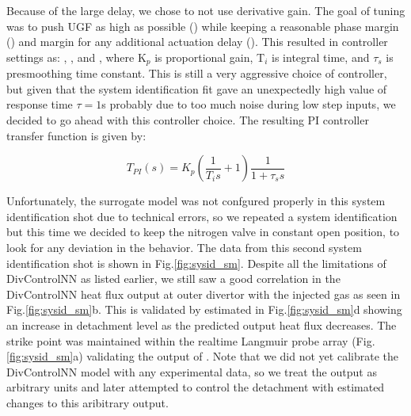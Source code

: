 Because of the large delay, we chose to not use derivative gain.
The goal of tuning was to push \ac{UGF} as high as possible (\AfracUGF) while keeping a reasonable phase margin (\AfracPhaseMargin) and margin for any additional actuation delay (\AfracDelayMargin).
This resulted in controller settings as: \AfracKp, \AfracTi, and \Afracstau, where K$_p$ is proportional gain, T$_i$ is integral time, and $\tau_s$ is presmoothing time constant.
This is still a very aggressive choice of controller, but given that the system identification fit gave an unexpectedly high value of response time $\tau=1$s probably due to too much noise during low step inputs, we decided to go ahead with this controller choice.
The resulting PI controller transfer function is given by:

\begin{equation}
    T_{PI}(s) = K_p \left( \frac{1}{T_i s} + 1\right) \frac{1}{1 + \tau_s s}
\label{eq:PI}
\end{equation}

Unfortunately, the surrogate model was not confgured properly in this system identification shot due to technical errors, so we repeated a system identification but this time we decided to keep the nitrogen valve in constant open position, to look for any deviation in the behavior.
The data from this second system identification shot is shown in Fig.\ref{fig:sysid_sm}.
Despite all the limitations of DivControlNN as listed earlier, we still saw a good correlation in the DivControlNN heat flux output at outer divertor with the injected gas as seen in Fig.\ref{fig:sysid_sm}b.
This is validated by estimated \Afrac in Fig.\ref{fig:sysid_sm}d showing an increase in detachment level as the predicted output heat flux decreases.
The strike point was maintained within the realtime Langmuir probe array (Fig.\ref{fig:sysid_sm}a) validating the output of \Afrac.
Note that we did not yet calibrate the DivControlNN model with any experimental data, so we treat the output as arbitrary units and later attempted to control the detachment with estimated changes to this aribitrary output.


